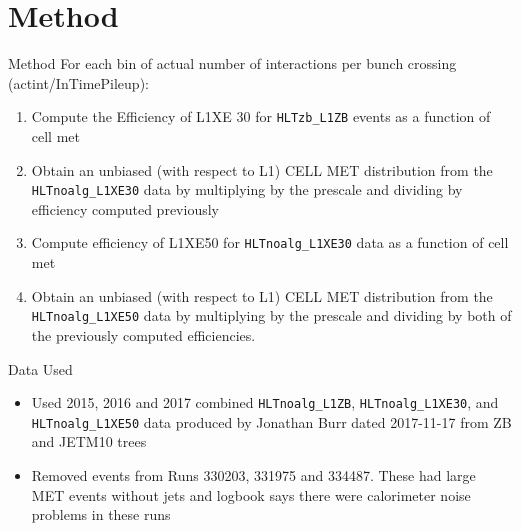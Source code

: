 \documentclass[]{beamer}
\begin{document}
\section{Method}
\begin{frame}{Method}
For each bin of actual number of interactions per bunch crossing (actint/InTimePileup):
\begin{enumerate}
        \item Compute the Efficiency of L1XE 30 for \texttt{HLTzb\_L1ZB} events as a function of cell met
        \item Obtain an unbiased (with respect to L1) CELL MET distribution from the \texttt{HLTnoalg\_L1XE30} data by multiplying by the prescale and dividing by efficiency computed previously
        \item Compute efficiency of L1XE50 for \texttt{HLTnoalg\_L1XE30} data as a function of cell met
        \item Obtain an unbiased (with respect to L1) CELL MET distribution from the \texttt{HLTnoalg\_L1XE50} data by multiplying by the prescale and dividing by both of the previously computed efficiencies.
\end{enumerate}
\end{frame}
\begin{frame}{Data Used}
  \begin{itemize}
          \item Used 2015, 2016 and 2017 combined \texttt{HLTnoalg\_L1ZB}, \texttt{HLTnoalg\_L1XE30}, and \texttt{HLTnoalg\_L1XE50} data produced by Jonathan Burr dated 2017-11-17 from ZB and JETM10 trees
		  \item Removed events from Runs 330203, 331975 and 334487. These had large MET events without jets and logbook says there were calorimeter noise problems in these runs
  \end{itemize}
\end{frame}
\end{document}
